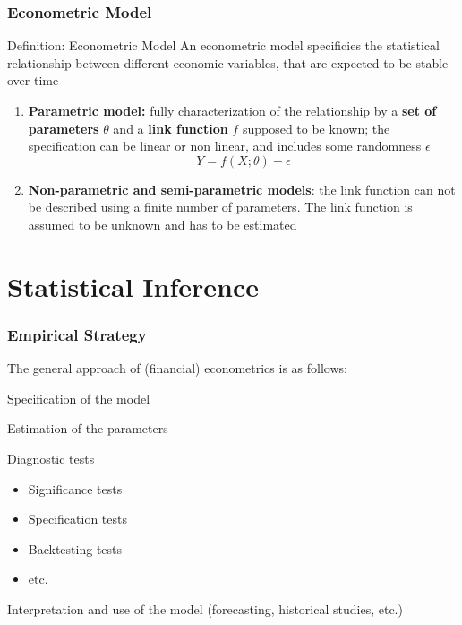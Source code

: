 \documentclass{beamer}
\newenvironment{wideenumerate}{\enumerate\addtolength{\itemsep}{10pt}}{\endenumerate}
\begin{document}
\begin{frame}
  \frametitle{Econometric Model}

  \begin{block}{Definition: Econometric Model}
    An econometric model specificies the statistical relationship between different economic variables, that are expected to be stable over time
  \end{block}

  \begin{enumerate}
  \item \textbf{Parametric model:} fully characterization of the relationship by a \textbf{set of parameters} $\theta$ and a \textbf{link function} $f$ supposed to be known; the specification can be linear or non linear, and includes some randomness $\epsilon$
    \begin{equation*}
      Y = f(X; \theta) + \epsilon
    \end{equation*}

  \item \textbf{Non-parametric and semi-parametric models}: the link function can not be described using a finite number of parameters. The link function is assumed to be unknown and has to be estimated
    
  \end{enumerate}
  
\end{frame}


\section{Statistical Inference}

\begin{frame}
  \frametitle{Empirical Strategy}
  The general approach of (financial) econometrics is as follows:\\
  \smallskip

  \begin{wideenumerate}
  \item Specification of the model
  \item Estimation of the parameters
  \item Diagnostic tests
    \begin{itemize}
    \item Significance tests
    \item Specification tests
    \item Backtesting tests
    \item etc.
    \end{itemize}
  \item Interpretation and use of the model (forecasting, historical studies, etc.)
  \end{wideenumerate}
  
\end{frame}
\end{document}
